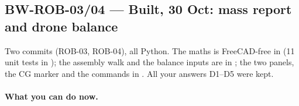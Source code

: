 \subsection{BW-ROB-03/04 --- Built, 30 Oct: mass report and drone balance}\label{sec:rob0304-built}

Two commits (ROB-03, ROB-04), all Python. The maths is FreeCAD-free in 
(11 unit tests in ); the assembly walk and the balance inputs are in
; the two panels, the CG marker and the commands in .
All your answers D1--D5 were kept.

\paragraph{What you can do now.}
